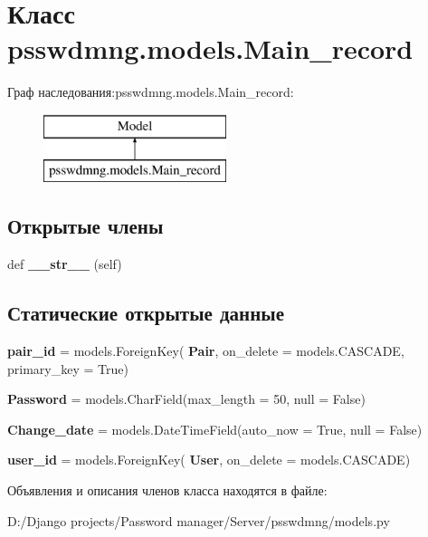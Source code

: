\section{Класс psswdmng.\+models.\+Main\+\_\+record}
\label{classpsswdmng_1_1models_1_1_main__record}
Граф наследования\+:psswdmng.\+models.\+Main\+\_\+record\+:\begin{figure}[H]
\begin{center}
\leavevmode
\includegraphics[height=2.000000cm]{classpsswdmng_1_1models_1_1_main__record}
\end{center}
\end{figure}
\subsection*{Открытые члены}
\begin{DoxyCompactItemize}
\item 
\mbox{\label{classpsswdmng_1_1models_1_1_main__record_a405fd695f2ac8a806a5cadc08e67307b}} 
def {\bfseries \+\_\+\+\_\+str\+\_\+\+\_\+} (self)
\end{DoxyCompactItemize}
\subsection*{Статические открытые данные}
\begin{DoxyCompactItemize}
\item 
\mbox{\label{classpsswdmng_1_1models_1_1_main__record_a1b29e178a49dcb508eae6eb205d2d0de}} 
{\bfseries pair\+\_\+id} = models.\+Foreign\+Key(\textquotesingle{}\textbf{ Pair}\textquotesingle{}, on\+\_\+delete = models.\+C\+A\+S\+C\+A\+DE, primary\+\_\+key = True)
\item 
\mbox{\label{classpsswdmng_1_1models_1_1_main__record_a078d0dae3283df008da48d747b5553c8}} 
{\bfseries Password} = models.\+Char\+Field(max\+\_\+length = 50, null = False)
\item 
\mbox{\label{classpsswdmng_1_1models_1_1_main__record_af2079a87752637d69416d08055ba4643}} 
{\bfseries Change\+\_\+date} = models.\+Date\+Time\+Field(auto\+\_\+now = True, null = False)
\item 
\mbox{\label{classpsswdmng_1_1models_1_1_main__record_a9bf44d5ad2319a9e6f51d4ebadf6678f}} 
{\bfseries user\+\_\+id} = models.\+Foreign\+Key(\textquotesingle{}\textbf{ User}\textquotesingle{}, on\+\_\+delete = models.\+C\+A\+S\+C\+A\+DE)
\end{DoxyCompactItemize}


Объявления и описания членов класса находятся в файле\+:\begin{DoxyCompactItemize}
\item 
D\+:/\+Django projects/\+Password manager/\+Server/psswdmng/models.\+py\end{DoxyCompactItemize}
